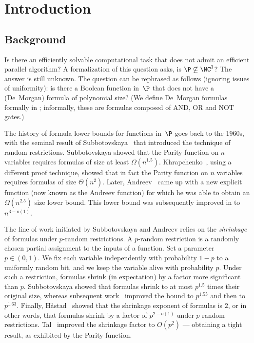 
%
%
%

\section{Introduction}

\subsection{Background}

%
%
%
%
%
Is there an efficiently solvable computational task
that does not admit an efficient parallel algorithm?  %
%
%
A formalization of this question asks,  %
is $\P\not\subseteq\NC^{1}$? The answer
%
is still unknown. The question can be rephrased as follows (ignoring issues of uniformity): 
is there a
Boolean  %
function in~$\P$ that does not have a (De~Morgan) formula of
polynomial size?   %
%
%
%
(We define De~Morgan formulas formally in ; informally, these are formulas composed of AND, OR and NOT gates.)

The history of formula lower bounds for functions in~$\P$ goes back
to the 1960s, with the seminal result of Subbotovskaya~\cite{S61}
that introduced the technique of random restrictions. Subbotovskaya
showed that the Parity function on $n$ variables requires formulas
of size at least $\Omega(n^{1.5})$. Khrapchenko~\cite{K72}, using
a different proof technique, showed that in fact the Parity function
on $n$ variables requires formulas of size $\Theta(n^{2})$. Later,
Andreev~\cite{A87} came up with a new explicit function (now known
as the Andreev function) for which he was able to obtain an $\Omega(n^{2.5})$
size lower bound. This lower bound was subsequently improved
%
%
in  %
\cite{IN93,PZ93,H98,T14}
to $n^{3-o(1)}$.

The line of work initiated by Subbotovskaya and Andreev relies on
the \emph{shrinkage} of formulas under $p$-random restrictions. A
$p$-random restriction is a randomly chosen partial assignment to
the inputs of a function. Set a parameter $p\in(0,1)$. We fix each
variable independently with probability $1-p$ to a uniformly random
bit, and we keep the variable alive with probability $p$. Under such
a restriction, formulas shrink (in expectation) by a factor more significant
than $p$. Subbotovskaya showed that formulas shrink to
at most $p^{1.5}$ times their original size, whereas subsequent
%
work~\cite{PZ93,IN93}  %
improved the bound to $p^{1.55}$ and
then to  %
$p^{1.63}$.
%
%
%
%
Finally, H{\aa}stad~\cite{H98} showed that the shrinkage
exponent of formulas is $2$, or in other words, that 
formulas shrink by a factor of $p^{2-o(1)}$ under $p$-random restrictions.
Tal~\cite{T14} improved the shrinkage factor to $O(p^{2})$ ---
obtaining a tight result, as exhibited by the Parity function.

